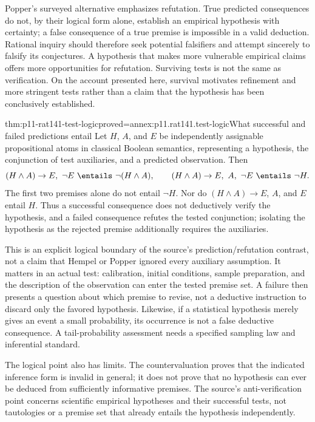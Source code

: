 Popper's surveyed alternative emphasizes refutation. True predicted
consequences do not, by their logical form alone, establish an empirical
hypothesis with certainty; a false consequence of a true premise is
impossible in a valid deduction. Rational inquiry should therefore
seek potential falsifiers and attempt sincerely to falsify its
conjectures. A hypothesis that makes more vulnerable empirical claims
offers more opportunities for refutation. Surviving tests is not the
same as verification. On the account presented here, survival motivates
refinement and more stringent tests rather than a claim that the
hypothesis has been conclusively established.

\begin{hbtheorem}{thm:p11-rat141-test-logic}{proved=annex:p11.rat141.test-logic}{What successful and failed predictions entail}
Let \(H\), \(A\), and \(E\) be independently assignable
propositional atoms in classical Boolean semantics, representing a
hypothesis, the conjunction of test auxiliaries, and a predicted
observation. Then
\[
 (H\land A)\to E,\ \neg E\ \entails\ \neg(H\land A),
 \qquad
 (H\land A)\to E,\ A,\ \neg E\ \entails\ \neg H.
\]
The first two premises alone do not entail \(\neg H\).
Nor do \((H\land A)\to E\), \(A\), and \(E\) entail \(H\).
Thus a successful consequence does not deductively verify the
hypothesis, and a failed consequence refutes the tested conjunction;
isolating the hypothesis as the rejected premise additionally requires
the auxiliaries.
\end{hbtheorem}

This is an explicit logical boundary of the source's prediction/refutation
contrast, not a claim that Hempel or Popper ignored every auxiliary
assumption. It matters in an actual test: calibration, initial
conditions, sample preparation, and the description of the observation
can enter the tested premise set. A failure then presents a question
about which premise to revise, not a deductive instruction to discard
only the favored hypothesis. Likewise, if a statistical hypothesis
merely gives an event a small probability, its occurrence is not a false
deductive consequence. A tail-probability assessment needs a specified
sampling law and inferential standard.

The logical point also has limits. The countervaluation proves that
the indicated inference form is invalid in general; it does not prove
that no hypothesis can ever be deduced from sufficiently informative
premises. The source's anti-verification point concerns scientific
empirical hypotheses and their successful tests, not tautologies or a
premise set that already entails the hypothesis independently.

